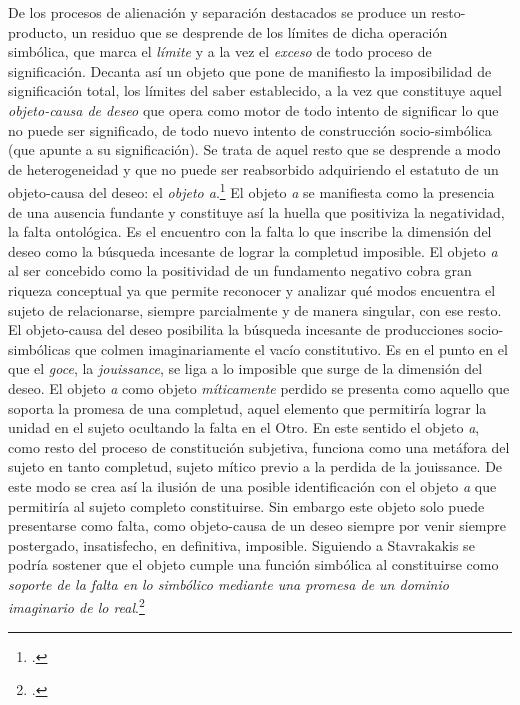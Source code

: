 De los procesos de alienación y separación destacados se produce un resto-producto, un residuo que se desprende de los límites de dicha operación simbólica, que marca el \emph{límite} y a la vez el \emph{exceso} de todo proceso de significación. Decanta así un objeto que pone de manifiesto la imposibilidad de significación total, los límites del saber establecido, a la vez que constituye aquel \emph{objeto-causa de deseo} que opera como motor de todo intento de significar lo que no puede ser significado, de todo nuevo intento de construcción socio-simbólica (que apunte a su significación). Se trata de aquel resto que se desprende a modo de heterogeneidad y que no puede ser reabsorbido adquiriendo el estatuto de un objeto-causa del deseo: el \emph{objeto a}.\footcite[]{@7106-LACAN2006} El objeto \emph{a} se manifiesta como la presencia de una ausencia fundante y constituye así la huella que positiviza la negatividad, la falta ontológica. Es el encuentro con la falta lo que inscribe la dimensión del deseo como la búsqueda incesante de lograr la completud imposible. El objeto \emph{a} al ser concebido como la positividad de un fundamento negativo cobra gran riqueza conceptual ya que permite reconocer y analizar qué modos encuentra el sujeto de relacionarse, siempre parcialmente y de manera singular, con ese resto. El objeto-causa del deseo posibilita la búsqueda incesante de producciones socio-simbólicas que colmen imaginariamente el vacío constitutivo. Es en el punto en el que el \emph{goce}, la \emph{jouissance}, se liga a lo imposible que surge de la dimensión del deseo. El objeto \emph{a} como objeto \emph{míticamente} perdido se presenta como aquello que soporta la promesa de una completud, aquel elemento que permitiría lograr la unidad en el sujeto ocultando la falta en el Otro. En este sentido el objeto \emph{a}, como resto del proceso de constitución subjetiva, funciona como una metáfora del sujeto en tanto completud, sujeto mítico previo a la perdida de la jouissance. De este modo se crea así la ilusión de una posible identificación con el objeto \emph{a} que permitiría al sujeto completo constituirse. Sin embargo este objeto solo puede presentarse como falta, como objeto-causa de un deseo siempre por venir siempre postergado, insatisfecho, en definitiva, imposible. Siguiendo a Stavrakakis se podría sostener que el objeto cumple una función simbólica al constituirse como \emph{soporte de la falta en lo simbólico mediante una promesa de un dominio imaginario de lo real}.\footcite[]{@7107-STAVRAKAKIS2007}

